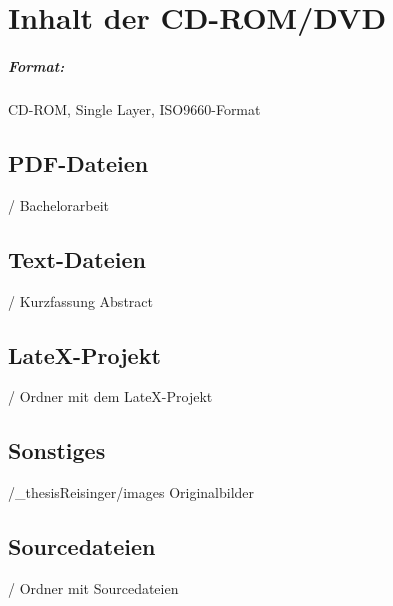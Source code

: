 \chapter{Inhalt der CD-ROM/DVD}
\label{app:cdrom}

\paragraph{Format:} 
		CD-ROM, Single Layer, ISO9660-Format%

\section{PDF-Dateien}
\begin{FileList}{/}
 Bachelorarbeit %
\end{FileList}

\section{Text-Dateien}
\begin{FileList}{/}
 Kurzfassung %
 Abstract %
\end{FileList}

\section{LateX-Projekt}

\begin{FileList}{/}
 Ordner mit dem LateX-Projekt %
\end{FileList}

\section{Sonstiges}

\begin{FileList}{/_thesisReisinger/images}
 Originalbilder %
\end{FileList}

\section{Sourcedateien}

\begin{FileList}{/}
   Ordner mit Sourcedateien %
\end{FileList}
